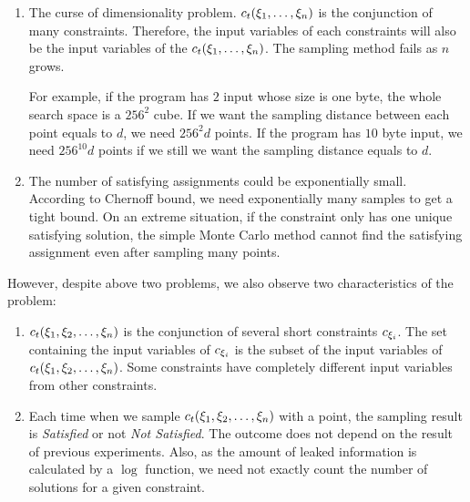 \begin{enumerate}
    \item The curse of dimensionality problem. $c_t({{\xi}_{1}},\ldots,{{\xi}_{n}})$ is
          the conjunction of many constraints. Therefore, the input variables
          of each constraints will also be the input variables of the
          $c_t({{\xi}_{1}},\ldots,{{\xi}_{n}})$. The sampling method fails
          as $n$ grows.

          For example, if the program has $2$ input whose size is
          one byte, the whole search space is a $256^2$ cube. If we want
          the sampling distance between each point equals to $d$, we need
          $256^2d$ points. If the program has $10$ byte input, we need
          $256^{10}d$ points if we still we want the sampling distance equals
          to $d$.

    \item The number of satisfying assignments could be exponentially small.
          According to Chernoff bound, we need exponentially many samples to
          get a tight bound.
          On an extreme situation, if the constraint only
          has one unique satisfying solution, the simple Monte Carlo method
          cannot find the satisfying assignment even after sampling many
          points.
\end{enumerate}

However, despite above two problems, we also observe two characteristics of the
problem:
\begin{enumerate}
    \item $c_t({{\xi}_{1}},{{\xi}_{2}},\ldots,{{\xi}_{n}})$ is the conjunction of
          several short constraints $c_{{\xi}_{i}}$. The set containing the
          input variables of $c_{{\xi}_{i}}$ is the subset of the input
          variables of $c_t({{\xi}_{1}},{{\xi}_{2}},\ldots,{{\xi}_{n}})$. Some
          constraints have completely different input variables from other
          constraints.

    \item Each time when we sample $c_t({{\xi}_{1}},{{\xi}_{2}},\ldots,{{\xi}_{n}})$
          with a point, the sampling result is \emph{Satisfied} or not \emph{Not Satisfied}.
          The outcome does not depend on the result of
          previous experiments. Also, as the amount of leaked information is calculated
          by a $\log$ function, we need not exactly count the number of solutions for
          a given constraint.


\end{enumerate}

